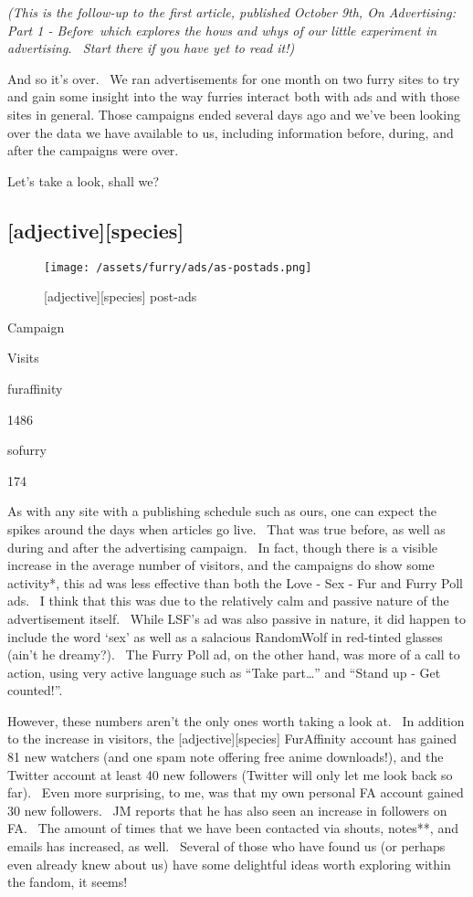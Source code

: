 \emph{(This is the follow-up to the first article, published October
9th, On Advertising: Part 1 - Before~which explores the hows and whys of
our little experiment in advertising. ~Start there if you have yet to
read it!)}

And so it's over. ~We ran advertisements for one month on two furry
sites to try and gain some insight into the way furries interact both
with ads and with those sites in general. Those campaigns ended several
days ago and we've been looking over the data we have available to us,
including information before, during, and after the campaigns were over.

Let's take a look, shall we?

\subsection{{[}adjective{]}{[}species{]}}\label{adjectivespecies}

\begin{figure}[htbp]
\centering
\texttt{[image: /assets/furry/ads/as-postads.png]}
\caption{{[}adjective{]}{[}species{]} post-ads}
\end{figure}

Campaign

Visits

furaffinity

1486

sofurry

174

As with any site with a publishing schedule such as ours, one can expect
the spikes around the days when articles go live. ~That was true before,
as well as during and after the advertising campaign. ~In fact, though
there is a visible increase in the average number of visitors, and the
campaigns do show some activity*, this ad was less effective than both
the Love - Sex - Fur and Furry Poll ads. ~I think that this was due to
the relatively calm and passive nature of the advertisement itself.
~While LSF's ad was also passive in nature, it did happen to include the
word `sex' as well as a salacious RandomWolf in red-tinted glasses
(ain't he dreamy?). ~The Furry Poll ad, on the other hand, was more of a
call to action, using very active language such as ``Take part\ldots{}''
and ``Stand up - Get counted!''.

However, these numbers aren't the only ones worth taking a look at. ~In
addition to the increase in visitors, the {[}adjective{]}{[}species{]}
FurAffinity account has gained 81 new watchers (and one spam note
offering free anime downloads!), and the Twitter account at least 40 new
followers (Twitter will only let me look back so far). ~Even more
surprising, to me, was that my own personal FA account gained 30 new
followers. ~JM reports that he has also seen an increase in followers on
FA. ~The amount of times that we have been contacted via shouts,
notes**, and emails has increased, as well. ~Several of those who have
found us (or perhaps even already knew about us) have some delightful
ideas worth exploring within the fandom, it seems!

